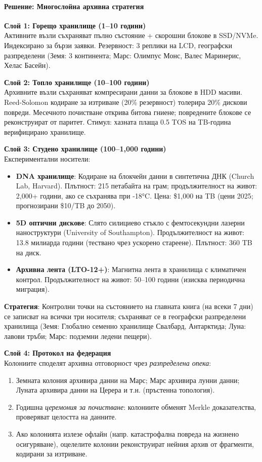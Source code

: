 \documentclass[11pt]{article}
\begin{document}
\paragraph{Решение: Многослойна архивна стратегия}

\textbf{Слой 1: Горещо хранилище (1--10 години)}\\
Активните възли съхраняват пълно състояние + скорошни блокове в SSD/NVMe. Индексирано за бързи заявки. Резервност: 3 реплики на LCD, географски разпределени (Земя: 3 континента; Марс: Олимпус Монс, Валес Маринерис, Хелас Басейн).

\textbf{Слой 2: Топло хранилище (10--100 години)}\\
Архивните възли съхраняват компресирани данни за блокове в HDD масиви. Reed-Solomon кодиране за изтриване (20\% резервност) толерира 20\% дискови повреди. Месечното почистване открива битова гниене; повредените блокове се реконструират от паритет. Стимул: хазната плаща 0.5 TOS на TB-година верифицирано хранилище.

\textbf{Слой 3: Студено хранилище (100--1,000 години)}\\
Експериментални носители:
\begin{itemize}[noitemsep]
  \item \textbf{DNA хранилище}: Кодиране на блокчейн данни в синтетична ДНК (Church Lab, Harvard). Плътност: 215 петабайта на грам; продължителност на живот: 2,000+ години, ако се съхранява при -18°C. Цена: \$1,000 на TB (цени 2025; прогнозирани \$10/TB до 2050).
  \item \textbf{5D оптични дискове}: Слято силициево стъкло с фемтосекундни лазерни наноструктури (University of Southampton). Продължителност на живот: 13.8 милиарда години (тествано чрез ускорено стареене). Плътност: 360 TB на диск.
  \item \textbf{Архивна лента (LTO-12+)}: Магнитна лента в хранилища с климатичен контрол. Продължителност на живот: 50--100 години (изисква периодична миграция).
\end{itemize}
\textbf{Стратегия}: Контролни точки на състоянието на главната книга (на всеки 7 дни) се записват на всички три носителя; съхраняват се в географски разпределени хранилища (Земя: Глобално семенно хранилище Свалбард, Антарктида; Луна: лавови тръби; Марс: подземни ледени пещери).

\textbf{Слой 4: Протокол на федерация}\\
Колониите споделят архивна отговорност чрез \emph{разпределена опека}:
\begin{enumerate}[noitemsep]
  \item Земната колония архивира данни на Марс; Марс архивира лунни данни; Луната архивира данни на Церера и т.н. (пръстенна топология).
  \item Годишна \emph{церемония за почистване}: колониите обменят Merkle доказателства, проверяват целостта на данните.
  \item Ако колонията излезе офлайн (напр. катастрофална повреда на жизнено осигуряване), оцелелите колонии реконструират нейния архив от фрагменти, кодирани за изтриване.
\end{enumerate}
\end{document}
